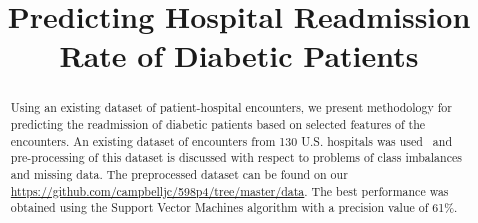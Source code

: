 \documentclass[conference]{IEEEtran}
\begin{document}
\title{Predicting Hospital Readmission Rate of Diabetic Patients}


\author{
\and
{}
\and
{}
}

\maketitle

\begin{abstract}

Using an existing dataset of patient-hospital encounters, we present methodology for predicting the readmission of diabetic patients based on selected features of the encounters. An existing dataset of encounters from 130 U.S. hospitals was used~\cite{dataset-2014} and pre-processing of this dataset is discussed with respect to problems of class imbalances and missing data. The preprocessed dataset can be found on our \hyperref[github page]{https://github.com/campbelljc/598p4/tree/master/data}. The best performance was obtained using the Support Vector Machines algorithm with a precision value of 61\%. 

\end{abstract}

%
\end{document}
